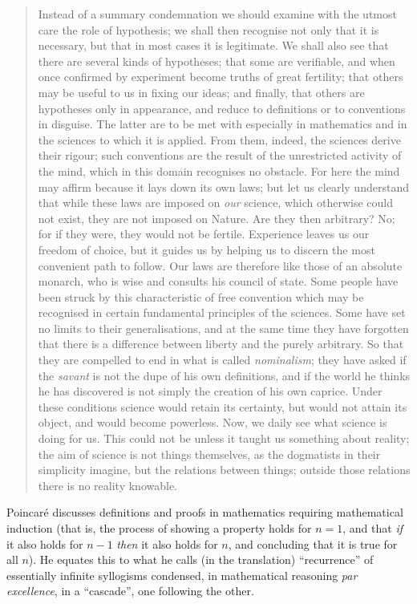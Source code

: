 \documentclass{article}
\begin{document}
\begin{quote}
    Instead of a summary condemnation we should examine with the utmost care the role of hypothesis; we shall then recognise not only that it is necessary, but that in most cases it is legitimate.  We shall also see that there are several kinds of hypotheses; that some are verifiable, and when once confirmed by experiment become truths of great fertility; that others may be useful to us in fixing our ideas; and finally, that others are hypotheses only in appearance, and reduce to definitions or to conventions in disguise.  The latter are to be met with especially in mathematics and in the sciences to which it is applied.  From them, indeed, the sciences derive their rigour; such conventions are the result of the unrestricted activity of the mind, which in this domain recognises no obstacle.  For here the mind may affirm because it lays down its own laws; but let us clearly understand that while these laws are imposed on \emph{our} science, which otherwise could not exist, they are not imposed on Nature.  Are they then arbitrary?  No; for if they were, they would not be fertile.  Experience leaves us our freedom of choice, but it guides us by helping us to discern the most convenient path to follow.  Our laws are therefore like those of an absolute monarch, who is wise and consults his council of state.  Some people have been struck by this characteristic of free convention which may be recognised in certain fundamental principles of the sciences.  Some have set no limits to their generalisations, and at the same time they have forgotten that there is a difference between liberty and the purely arbitrary.  So that they are compelled to end in what is called \emph{nominalism}; they have asked if the \emph{savant} is not the dupe of his own definitions, and if the world he thinks he has discovered is not simply the creation of his own caprice.  Under these conditions science would retain its certainty, but would not attain its object, and would become powerless.  Now, we daily see what science is doing for us.  This could not be unless it taught us something about reality; the aim of science is not things themselves, as the dogmatists in their simplicity imagine, but the relations between things; outside those relations there is no reality knowable.  \citep[p. xxii-xxiv]{Poincare1952}
\end{quote}

Poincar\'e discusses definitions and proofs in mathematics requiring mathematical induction (that is, the process of showing a property holds for $n = 1$, and that \emph{if} it also holds for $n - 1$ \emph{then} it also holds for $n$, and concluding that it is true for all $n$).  He equates this to what he calls (in the translation) ``recurrence'' of essentially infinite syllogisms condensed, in mathematical reasoning \emph{par excellence}, in a ``cascade'', one following the other.  \citep[p. 9]{Poincare1952}  
\end{document}

